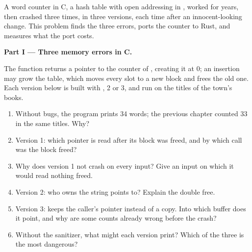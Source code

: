\begin{problem}\label{pb:b2:rust-ownership:1}
A word counter in C, a hash table with open addressing in , worked for years, then crashed three times,
in three versions, each time after an innocent-looking change. This problem finds the three errors, ports the
counter to Rust, and measures what the port costs.

\medskip\noindent\textbf{Part I --- Three memory errors in C.}\par\nopagebreak
The function  returns a pointer to the counter of , creating it at 0; an
insertion may grow the table, which moves every slot to a new block and frees the old one. Each version below is
built with , 2 or 3, and run on the titles of the town's books.
\begin{enumerate}[beginpenalty=10000]
\item Without bugs, the program prints 34 words; the previous chapter counted 33 in the same titles. Why?
\item Version 1: which pointer is read after its block was freed, and by which call was the block freed?
\item Why does version 1 not crash on every input? Give an input on which it would read nothing freed.
\item Version 2: who owns the string  points to? Explain the double free.
\item Version 3:  keeps the caller's pointer instead of a copy. Into which buffer does it point, and
why are some counts already wrong before the crash?
\item Without the sanitizer, what might each version print? Which of the three is the most dangerous?
\end{enumerate}


\end{problem}
